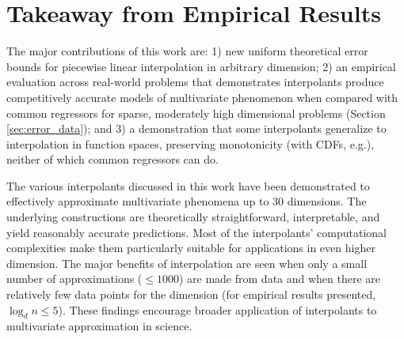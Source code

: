 \section{Takeaway from Empirical Results}
\label{sec:error_conclusion}

The major contributions of this work are: 1) new uniform theoretical
error bounds for piecewise linear interpolation in arbitrary dimension;
2) an empirical evaluation across
real-world problems that demonstrates interpolants produce
competitively accurate models of multivariate phenomenon when compared
with common regressors for sparse, moderately high dimensional
problems (Section \ref{sec:error_data}); and 3) a demonstration that some
interpolants generalize to interpolation in function spaces, 
preserving monotonicity (with CDFs, e.g.), neither
of which common regressors can do.

The various interpolants discussed in this work have been
demonstrated to effectively approximate multivariate phenomena up to
$30$ dimensions. The underlying constructions are theoretically
straightforward, interpretable, and yield reasonably accurate
predictions. Most of the interpolants' computational complexities make
them particularly suitable for applications in even higher
dimension. The major benefits of interpolation are seen when only a
small number of approximations ($\leq 1000$) are made from data and
when there are relatively few data points for the dimension (for
empirical results presented, $\log_d n \leq 5$). These findings
encourage broader application of interpolants to multivariate
approximation in science.




